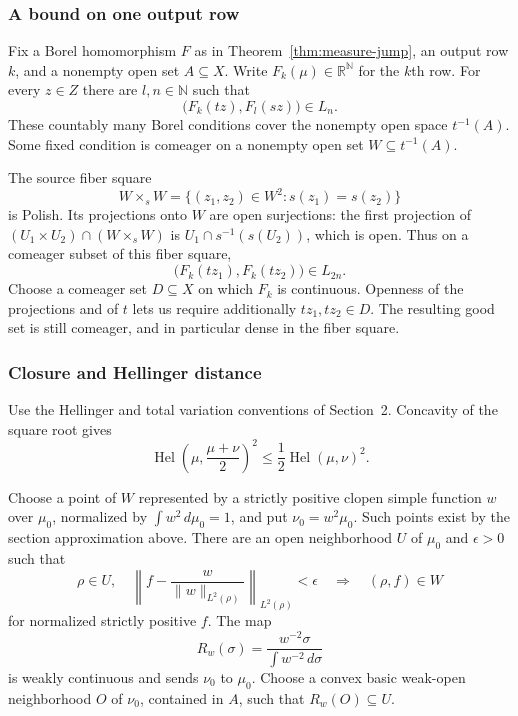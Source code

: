 \documentclass[11pt]{article}
\numberwithin{equation}{section}
\theoremstyle{definition}
\newcommand{\N}{\mathbb N}
\newcommand{\R}{\mathbb R}
\newcommand{\Hel}{\operatorname{Hel}}
\begin{document}
\subsubsection{A bound on one output row}
Fix a Borel homomorphism $F$ as in Theorem~\ref{thm:measure-jump},
an output row $k$, and a nonempty open set $A\subseteq X$.
Write $F_k(\mu)\in\R^\N$ for the $k$th row.
For every $z\in Z$ there are $l,n\in\N$ such that
\begin{equation}\label{eq:measure-1}
\bigl(F_k(tz),F_l(sz)\bigr)\in L_n.
\end{equation}
These countably many Borel conditions cover the nonempty open space
$t^{-1}(A)$. Some fixed condition is comeager on a nonempty open set
$W\subseteq t^{-1}(A)$.

The source fiber square
\[
 W\times_s W=\{(z_1,z_2)\in W^2:s(z_1)=s(z_2)\}
\]
is Polish. Its projections onto $W$ are open surjections: the first
projection of $(U_1\times U_2)\cap(W\times_s W)$ is
$U_1\cap s^{-1}(s(U_2))$, which is open.
Thus on a comeager subset of this fiber square,
\begin{equation}\label{eq:measure-2}
\bigl(F_k(tz_1),F_k(tz_2)\bigr)\in L_{2n}.
\end{equation}
Choose a comeager set $D\subseteq X$ on which $F_k$ is continuous.
Openness of the projections and of $t$ lets us require additionally
$tz_1,tz_2\in D$. The resulting good set is still comeager, and in
particular dense in the fiber square.

\subsubsection{Closure and Hellinger distance}
Use the Hellinger and total variation conventions of Section~2. Concavity of the square root gives
\begin{equation}\label{eq:measure-3}
\Hel\left(\mu,\frac{\mu+\nu}{2}\right)^2
       \le \frac12 \Hel(\mu,\nu)^2.
\end{equation}

Choose a point of $W$ represented by a strictly positive clopen simple
function $w$ over $\mu_0$, normalized by $\int w^2\,d\mu_0=1$, and put
$\nu_0=w^2\mu_0$. Such points exist by the section approximation above.
There are an open neighborhood $U$ of $\mu_0$ and $\epsilon>0$ such that
\begin{equation}\label{eq:measure-4}
\rho\in U,\quad
 \left\|f-\frac{w}{\|w\|_{L^2(\rho)}}\right\|_{L^2(\rho)}<\epsilon
 \quad\Longrightarrow\quad(\rho,f)\in W
\end{equation}
for normalized strictly positive $f$.
The map
\[
 R_w(\sigma)=\frac{w^{-2}\sigma}{\int w^{-2}\,d\sigma}
\]
is weakly continuous and sends $\nu_0$ to $\mu_0$.
Choose a convex basic weak-open neighborhood $O$ of $\nu_0$, contained
in $A$, such that $R_w(O)\subseteq U$.
\end{document}
